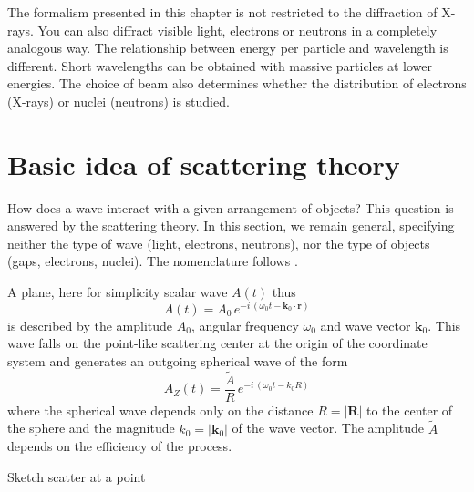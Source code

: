 The formalism presented in this chapter is not restricted to the diffraction of X-rays. You can also diffract visible light, electrons or neutrons in a completely analogous way. The relationship between energy per particle and wavelength is different. Short wavelengths can be obtained with massive particles at lower energies.  The choice of beam also determines whether the distribution of electrons (X-rays) or nuclei (neutrons) is studied.

\section{Basic idea of scattering theory}

How does a wave interact with a given arrangement of objects? This question is answered by the scattering theory. In this section, we remain general, specifying neither the type of wave (light, electrons, neutrons), nor the type of objects (gaps, electrons, nuclei). The nomenclature follows \cite{Hunklinger2014}.

A plane, here for simplicity scalar wave $A(t)$ thus
\begin{equation}
 A(t) = A_0 \, e^{- i \, (\omega_0 t - \mathbf{k}_0 \cdot \mathbf{r})}
\end{equation}
is described by the amplitude $A_0$, angular frequency $\omega_0$ and wave vector $\mathbf{k}_0$. This wave falls on the point-like scattering center at the origin of the coordinate system and generates  an outgoing spherical wave of the form
\begin{equation}
 A_Z(t) = \frac{\tilde{A}}{R} \, e^{- i \, (\omega_0 t - k_0 R)}
\end{equation}
where the spherical wave depends only on the distance $R = |\mathbf{R}|$ to the center of the sphere and the magnitude $k_0 = | \mathbf{k}_0| $ of the wave vector. The amplitude $\tilde{A}$ depends on the efficiency of the process.

\begin{marginfigure}
\caption{Sketch scatter at a point}
\end{marginfigure}

